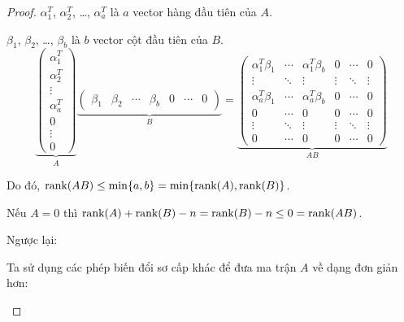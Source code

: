 \documentclass[class=linearalgebra,crop=false]{standalone}
\begin{document}
\begin{proof}
    \par $\alpha_{1}^{T}$, $\alpha_{2}^{T}$, \ldots, $\alpha_{a}^{T}$ là $a$ vector hàng đầu tiên của $A$.
    \par $\beta_{1}$, $\beta_{2}$, \ldots, $\beta_{b}$ là $b$ vector cột đầu tiên của $B$.
    \[
        \underbrace{\begin{pmatrix}
                \alpha_{1}^{T} \\
                \alpha_{2}^{T} \\
                \vdots         \\
                \alpha_{a}^{T} \\
                0              \\
                \vdots         \\
                0
            \end{pmatrix}}_{A}
        \underbrace{\begin{pmatrix}
                \beta_{1} & \beta_{2} & \cdots & \beta_{b} & 0 & \cdots & 0
            \end{pmatrix}}_{B}
        =
        \underbrace{\begin{pmatrix}
                \alpha_{1}^{T}\beta_{1} & \cdots & \alpha_{1}^{T}\beta_{b} & 0      & \cdots & 0      \\
                \vdots                  & \ddots & \vdots                  & \vdots & \ddots & \vdots \\
                \alpha_{a}^{T}\beta_{1} & \cdots & \alpha_{a}^{T}\beta_{b} & 0      & \cdots & 0      \\
                0                       & \cdots & 0                       & 0      & \cdots & 0      \\
                \vdots                  & \ddots & \vdots                  & \vdots & \ddots & \vdots \\
                0                       & \cdots & 0                       & 0      & \cdots & 0
            \end{pmatrix}}_{AB}
    \]
    \par Do đó, $\text{rank}(AB)\le \min\{ a, b \} = \min\{ \text{rank}(A), \text{rank}(B) \}$.
    \bigskip
    \par Nếu $A = 0$ thì $\text{rank}(A) + \text{rank}(B) - n = \text{rank}(B) - n\le 0 = \text{rank}(AB)$.
    \par Ngược lại:
    \par Ta sử dụng các phép biến đổi sơ cấp khác để đưa ma trận $A$ về dạng đơn giản hơn:
    \begin{enumerate}[label = (\roman*)]

\end{enumerate}
\end{proof}
\end{document}

